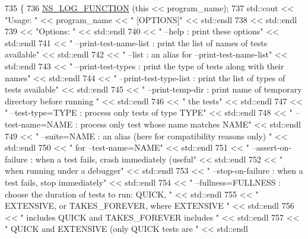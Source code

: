\begin{DoxyCode}
735 \{
736   \hyperlink{log-macros-disabled_8h_a90b90d5bad1f39cb1b64923ea94c0761}{NS\_LOG\_FUNCTION} (\textcolor{keyword}{this} << program\_name);
737   std::cout << \textcolor{stringliteral}{"Usage: "} << program\_name << \textcolor{stringliteral}{" [OPTIONS]"} << std::endl
738             << std::endl
739             << \textcolor{stringliteral}{"Options: "} << std::endl
740             << \textcolor{stringliteral}{"  --help                 : print these options"} << std::endl
741             << \textcolor{stringliteral}{"  --print-test-name-list : print the list of names of tests available"} << std::endl
742             << \textcolor{stringliteral}{"  --list                 : an alias for --print-test-name-list"} << std::endl
743             << \textcolor{stringliteral}{"  --print-test-types     : print the type of tests along with their names"} << std::endl
744             << \textcolor{stringliteral}{"  --print-test-type-list : print the list of types of tests available"} << std::endl
745             << \textcolor{stringliteral}{"  --print-temp-dir       : print name of temporary directory before running "} << std::endl
746             << \textcolor{stringliteral}{"                           the tests"} << std::endl
747             << \textcolor{stringliteral}{"  --test-type=TYPE       : process only tests of type TYPE"} << std::endl
748             << \textcolor{stringliteral}{"  --test-name=NAME       : process only test whose name matches NAME"} << std::endl
749             << \textcolor{stringliteral}{"  --suite=NAME           : an alias (here for compatibility reasons only) "} << std::endl
750             << \textcolor{stringliteral}{"                           for --test-name=NAME"} << std::endl
751             << \textcolor{stringliteral}{"  --assert-on-failure    : when a test fails, crash immediately (useful"} << std::endl
752             << \textcolor{stringliteral}{"                           when running under a debugger"} << std::endl
753             << \textcolor{stringliteral}{"  --stop-on-failure      : when a test fails, stop immediately"} << std::endl
754             << \textcolor{stringliteral}{"  --fullness=FULLNESS    : choose the duration of tests to run: QUICK, "} << std::endl
755             << \textcolor{stringliteral}{"                           EXTENSIVE, or TAKES\_FOREVER, where EXTENSIVE "} << std::endl
756             << \textcolor{stringliteral}{"                           includes QUICK and TAKES\_FOREVER includes "} << std::endl
757             << \textcolor{stringliteral}{"                           QUICK and EXTENSIVE (only QUICK tests are "} << std::endl

\end{DoxyCode}
